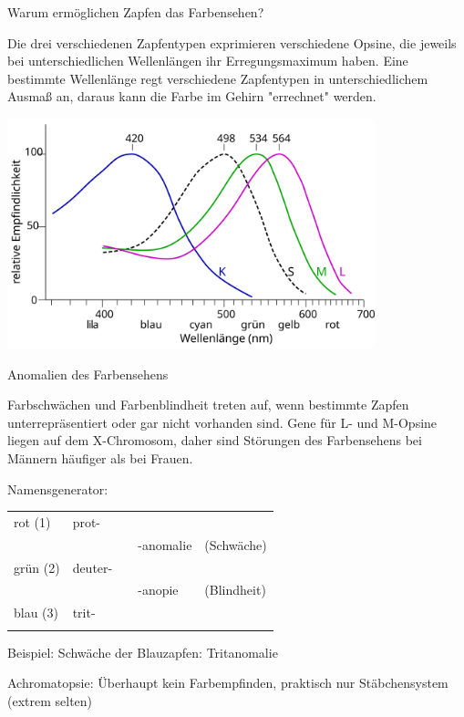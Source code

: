 \documentclass{beamer}
\begin{document}


\begin{frame}{Warum ermöglichen Zapfen das Farbensehen?}

Die drei verschiedenen Zapfentypen exprimieren verschiedene Opsine, die jeweils bei unterschiedlichen Wellenlängen ihr Erregungsmaximum haben. Eine bestimmte Wellenlänge regt verschiedene Zapfentypen in unterschiedlichem Ausmaß an, daraus kann die Farbe im Gehirn "errechnet" werden. 

\begin{center}
        \includegraphics[width=0.8\textwidth]{Cone-response-de.png}
    \end{center}
    
\end{frame}


\begin{frame}{Anomalien des Farbensehens}

Farbschwächen und Farbenblindheit treten auf, wenn bestimmte Zapfen unterrepräsentiert oder gar nicht vorhanden sind. Gene für L- und M-Opsine liegen auf dem X-Chromosom, daher sind Störungen des Farbensehens bei Männern häufiger als bei Frauen. \\[0.5 cm]

\pause

Namensgenerator: \\[0.5 cm]


\begin{tabular}{lllll}
rot (1)    & prot- & \\
            &       & & -anomalie &  (Schwäche)\\
grün (2)    & deuter-  &&\\
            &           & \qquad& -anopie & (Blindheit) \\
blau (3)     & trit- \\&
\end{tabular}

Beispiel: Schwäche der Blauzapfen: \pause Tritanomalie

\pause

Achromatopsie: Überhaupt kein Farbempfinden, praktisch nur Stäbchensystem (extrem selten)
\end{frame}
\end{document}
